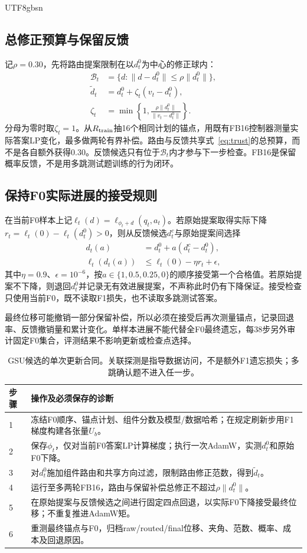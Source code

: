 \documentclass[sigconf,anonymous,review]{acmart}
\begin{document}
\begin{CJK*}{UTF8}{gbsn}
\subsection{总修正预算与保留反馈}
记$\rho=0.30$，先将路由提案限制在以$d_t^0$为中心的修正球内：
\begin{align}
 \mathcal B_t&=\{d:\|d-d_t^0\|\leq\rho\|d_t^0\|\},\\
 \widetilde d_t&=d_t^0+\zeta_t(v_t-d_t^0),\\
 \zeta_t&=\min\left\{1,
 \frac{\rho\|d_t^0\|}{\|v_t-d_t^0\|}\right\}.
 \label{eq:trust}
\end{align}
分母为零时取$\zeta_t=1$。从$R_{\rm train}$抽16个相同计划的锚点，用既有FB16控制器测量实际答案LP变化，最多做两轮有界补偿。路由与反馈共享式~\eqref{eq:trust}的总预算，而不是各自额外获得0.30。反馈候选只有位于$\mathcal B_t$内才参与下一步检查。FB16是保留概率反馈，不是用多跳测试题训练的行为闭环。

\subsection{保持F0实际进展的接受规则}
在当前F0样本上记$\ell_t(d)=\ell_{\phi_t+d}(q_t,a_t)$。若原始提案取得实际下降$r_t=\ell_t(0)-\ell_t(d_t^0)>0$，则从反馈候选$d_t^c$与原始提案间选择
\begin{align}
 d_t(a)&=d_t^0+a(d_t^c-d_t^0),\\
 \ell_t(d_t(a))&\leq\ell_t(0)-\eta r_t+\epsilon,
 \label{eq:guard}
\end{align}
其中$\eta=0.9$、$\epsilon=10^{-6}$，按$a\in\{1,0.5,0.25,0\}$的顺序接受第一个合格值。若原始提案不下降，则退回$d_t^0$并记录无有效进展提案，不声称此时仍有下降保证。接受检查只使用当前F0，既不读取F1损失，也不读取多跳测试答案。

最终位移可能撤销一部分保留补偿，所以必须在接受后再次测量锚点，记录回退率、反馈撤销量和累计变化。单样本进展不能代替全F0最终遗忘，每38步另外审计固定F0集合，评测结果不影响更新或检查点选择。

\begin{table}[t]
\caption{GSU候选的单次更新合同。关联探测是指导数据访问，不是额外F1遗忘损失；多跳确认题不进入任一步。}
\label{tab:algorithm}
\centering\small
\begin{tabular}{p{}p{}}
\toprule
步骤 & 操作及必须保存的诊断\\
\midrule
1 & 冻结F0顺序、锚点计划、组件分数及模型/数据哈希；在规定刷新步用F1梯度构建各张量$U_b$。\\
2 & 保存$\phi_t$，仅对当前F0答案LP计算梯度；执行一次AdamW，实测$d_t^0$和原始F0下降。\\
3 & 对$d_t^0$施加组件路由和共享方向过滤，限制路由修正范数，得到$\widetilde d_t$。\\
4 & 运行至多两轮FB16，路由与保留补偿总修正不超过$\rho\|d_t^0\|$。\\
5 & 在原始提案与反馈候选之间进行固定四点回退，以实际F0下降接受最终位移；不重复推进AdamW矩。\\
6 & 重测最终锚点与F0，归档raw/routed/final位移、夹角、范数、概率、成本及回退原因。\\
\bottomrule
\end{tabular}
\end{table}


\end{CJK*}
\end{document}
